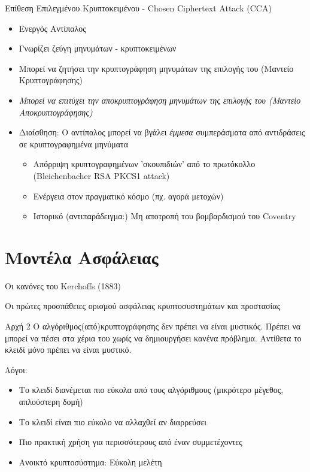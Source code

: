 \documentclass[handout]{beamer}
\begin{document}
\begin{frame} {Επίθεση Επιλεγμένου Κρυπτοκειμένου - Chosen Ciphertext Attack (CCA)}
\begin{itemize}
\item Ενεργός Αντίπαλος
\item Γνωρίζει ζεύγη μηνυμάτων - κρυπτοκειμένων
\item Μπορεί να ζητήσει την κρυπτογράφηση μηνυμάτων της επιλογής του (Μαντείο Κρυπτογράφησης)
\item \emph{Μπορεί να επιτύχει την αποκρυπτογράφηση μηνυμάτων της επιλογής του (Μαντείο Αποκρυπτογράφησης)} \pause
\item Διαίσθηση: Ο αντίπαλος μπορεί να βγάλει \emph{έμμεσα} συμπεράσματα από αντιδράσεις σε κρυπτογραφημένα μηνύματα
\begin{itemize}
\item Απόρριψη κρυπτογραφημένων 'σκουπιδιών' από το πρωτόκολλο (Bleichenbacher RSA PKCS1 attack)
\item Ενέργεια στον πραγματικό κόσμο (πχ. αγορά μετοχών)
\item Ιστορικό (αντιπαράδειγμα:) Μη αποτροπή του βομβαρδισμού του Coventry
\end{itemize}
\end{itemize}
\end{frame}

\section{Μοντέλα Ασφάλειας}

\begin{frame}{Οι κανόνες του Kerchoffs (1883)}

Οι πρώτες προσπάθειες ορισμού ασφάλειας κρυπτοσυστημάτων και προστασίας 

\pause 

\begin{block}{Αρχή 2}
Ο αλγόριθμος(από)κρυπτογράφησης δεν πρέπει να είναι μυστικός. Πρέπει να μπορεί να πέσει στα χέρια του \adv χωρίς να δημιουργήσει κανένα πρόβλημα. Αντίθετα το κλειδί μόνο πρέπει να είναι μυστικό.
\end{block}

Λόγοι: \pause 

\begin{itemize}
\item Tο κλειδί διανέμεται πιο εύκολα από τους αλγόριθμους (μικρότερο μέγεθος, απλούστερη δομή)  
\item Το κλειδί είναι πιο εύκολο να αλλαχθεί αν διαρρεύσει
\item Πιο πρακτική χρήση για περισσότερους από έναν συμμετέχοντες
\item Ανοικτό κρυπτοσύστημα: Εύκολη μελέτη 
\end{itemize}

\end{frame}
\end{document}
